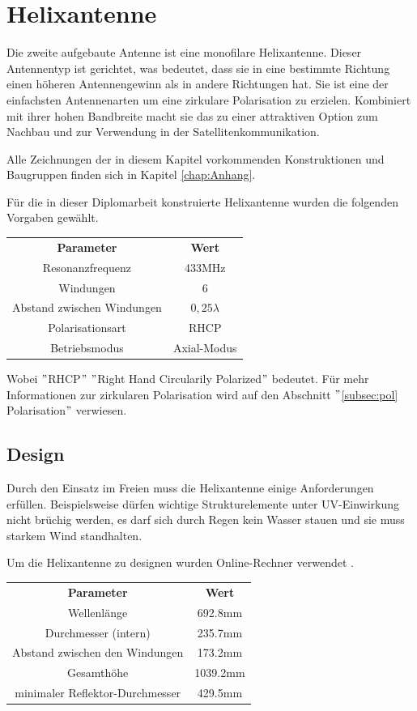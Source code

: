\chapter{Helixantenne}
\label{chap:helix}
Die zweite aufgebaute Antenne ist eine monofilare Helixantenne. Dieser Antennentyp ist gerichtet, was bedeutet, dass sie in eine bestimmte Richtung einen höheren Antennengewinn als in andere Richtungen hat. Sie ist eine der einfachsten Antennenarten um eine zirkulare Polarisation zu erzielen. Kombiniert mit ihrer hohen Bandbreite macht sie das zu einer attraktiven Option zum Nachbau und zur Verwendung in der Satellitenkommunikation\cite{helixWebsite}.

Alle Zeichnungen der in diesem Kapitel vorkommenden Konstruktionen und Baugruppen finden sich in Kapitel \ref{chap:Anhang}.

Für die in dieser Diplomarbeit konstruierte Helixantenne wurden die folgenden Vorgaben gewählt.

\begin{center}
	\begin{tabular}{|c|c|}
	\textbf{Parameter} & \textbf{Wert}\\
	Resonanzfrequenz & 433MHz\\
	Windungen & 6\\
	Abstand zwischen Windungen & $0,25\lambda$\\
	Polarisationsart & RHCP\\
	Betriebsmodus & Axial-Modus
\end{tabular}
\end{center}

Wobei $"$RHCP$"$ $"$Right Hand Circularily Polarized$"$ bedeutet. Für mehr Informationen zur zirkularen Polarisation wird auf den Abschnitt $"$\ref{subsec:pol} Polarisation$"$ verwiesen.

\section{Design}
Durch den Einsatz im Freien muss die Helixantenne einige Anforderungen erfüllen. Beispielsweise dürfen wichtige Strukturelemente unter UV-Einwirkung nicht brüchig werden, es darf sich durch Regen kein Wasser stauen und sie muss starkem Wind standhalten. 

Um die Helixantenne zu designen wurden Online-Rechner verwendet \cite{calculator_daycounter, calculator_jcoppens}.

\begin{center}
	\begin{tabular}{|c|c|}
	\textbf{Parameter} & \textbf{Wert} \\
	Wellenlänge &  692.8mm\\
	Durchmesser (intern) & 235.7mm\\
	Abstand zwischen den Windungen & 173.2mm\\
	Gesamthöhe & 1039.2mm\\
	minimaler Reflektor-Durchmesser & 429.5mm
\end{tabular}
\end{center}

